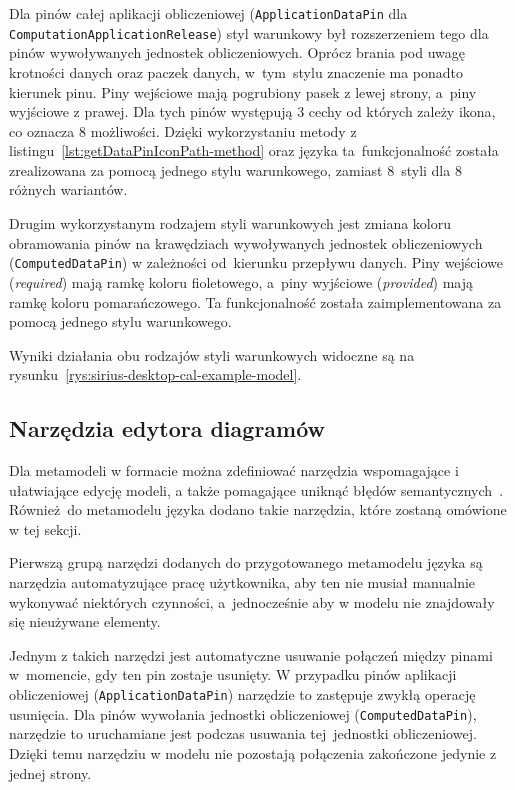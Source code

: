 Dla pinów całej aplikacji obliczeniowej (\texttt{Application\-Data\-Pin} dla
\texttt{Computation\-Application\-Release}) styl warunkowy był
rozszerzeniem tego
dla pinów wywoływanych jednostek obliczeniowych. Oprócz brania pod uwagę
krotności danych
oraz
paczek danych, w~tym~stylu znaczenie ma ponadto kierunek pinu. Piny wejściowe
mają pogrubiony pasek z lewej strony, a~piny wyjściowe z prawej. Dla tych
pinów występują 3 cechy od których zależy ikona, co oznacza 8 możliwości.
Dzięki wykorzystaniu metody z listingu~\ref{lst:getDataPinIconPath-method} oraz
języka \AQL{} ta~funkcjonalność została zrealizowana za pomocą jednego stylu
warunkowego, zamiast 8~styli dla 8 różnych wariantów.

Drugim wykorzystanym rodzajem styli warunkowych jest zmiana koloru obramowania
pinów na krawędziach wywoływanych jednostek obliczeniowych
(\texttt{ComputedDataPin}) w
zależności od~kierunku przepływu danych. Piny wejściowe (\emph{required}) mają
ramkę koloru fioletowego, a~piny wyjściowe (\emph{provided}) mają ramkę koloru
pomarańczowego. Ta funkcjonalność została zaimplementowana za pomocą jednego
stylu warunkowego.

Wyniki działania obu rodzajów styli warunkowych widoczne są na
rysunku~\ref{rys:sirius-desktop-cal-example-model}.

\subsection{Narzędzia edytora diagramów}\label{sec:cal-metamodel-tools}

Dla metamodeli w formacie \Ecore{} można zdefiniować narzędzia wspomagające i
ułatwiające edycję modeli, a także pomagające uniknąć
błędów semantycznych~\cite{sirius-desktop-documentation-tools}. Również do
metamodelu języka
\CAL{} dodano takie narzędzia, które zostaną omówione w tej sekcji.

Pierwszą grupą narzędzi dodanych do przygotowanego metamodelu języka \CAL{} są
narzędzia
automatyzujące pracę użytkownika, aby ten nie musiał manualnie wykonywać
niektórych czynności, a~jednocześnie aby w modelu nie znajdowały się nieużywane
elementy.

Jednym z takich narzędzi jest automatyczne usuwanie połączeń między pinami
w~momencie, gdy ten pin zostaje usunięty. W przypadku pinów aplikacji
obliczeniowej (\texttt{Application\-Data\-Pin}) narzędzie to zastępuje zwykłą
operację usunięcia. Dla pinów wywołania jednostki obliczeniowej
(\texttt{ComputedDataPin}), narzędzie to uruchamiane jest podczas usuwania
tej~jednostki obliczeniowej. Dzięki temu narzędziu w modelu nie pozostają
połączenia
zakończone jedynie z jednej strony.

